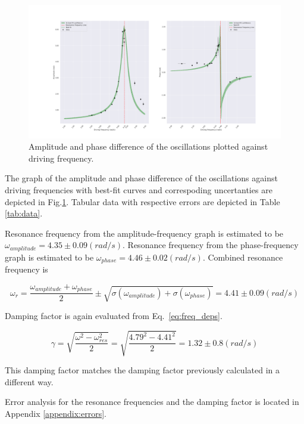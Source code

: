 \begin{figure}[H]
  \centering
  \includegraphics[width=1\textwidth]{oscillations/images/resonance}
  \caption{Amplitude and phase difference of the oscillations plotted against driving frequency.}
  \label{fig:resonance}
\end{figure}

The graph of the amplitude and phase difference of the oscillations against driving frequencies with best-fit curves and correspoding uncertanties are depicted in Fig.\ref{fig:resonance}. Tabular data with respective errors are depicted in Table \ref{tab:data}.

Resonance frequency from the amplitude-frequency graph is estimated to be $\omega_{amplitude} = 4.35 \pm 0.09 (rad/s)$. Resonance frequency from the phase-frequency graph is estimated to be $\omega_{phase} = 4.46 \pm 0.02 (rad/s)$. Combined resonance frequency is

\begin{equation*}
\omega_{r} = \frac{\omega_{amplitude} + \omega_{phase}}{2} \pm \sqrt{\sigma(\omega_{amplitude}) + \sigma(\omega_{phase})} = 4.41 \pm 0.09 (rad/s)
\end{equation*}

Damping factor is again evaluated from Eq.~\ref{eq:freq_deps}.

\begin{equation*}
        \gamma = \sqrt{ \frac{\omega^2 - \omega_{res}^2}{2} } = \sqrt{ \frac{4.79^2 - 4.41^2}{2} } = 1.32 \pm 0.8 (rad/s)
\end{equation*}       

This damping factor matches the damping factor previously calculated in a different way.

Error analysis for the resonance frequencies and the damping factor is located in Appendix \ref{appendix:errors}.
